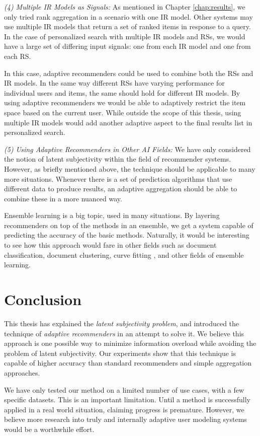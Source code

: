 \emph{(4) Multiple IR Models as Signals:}
As mentioned in Chapter \ref{chap:results},
we only tried rank aggregation in a scenario with one IR model.
Other systems may use multiple IR models
that return a set of ranked items in response to a query.
In the case of personalized search with multiple IR models
and RSs, we would have a large set of differing
input signals:
one from each IR model and one from each RS.

In this case, adaptive recommenders could be used to combine
both the RSs and IR models.
In the same way different RSs have varying performance
for individual users and items, the same should hold
for different IR models.
By using adaptive recommenders we would be able
to adaptively restrict the item space based on the 
current user.
While outside the scope of this thesis,
using multiple IR models would add another adaptive
aspect to the final results list in personalized search.


\emph{(5) Using Adaptive Recommenders in Other AI Fields:}
We have only considered the notion of latent subjectivity within the field of recommender systems.
However, as briefly mentioned above, the technique should be applicable to many more situations.
Whenever there is a set of prediction algorithms that use different data to produce results,
an adaptive aggregation should be able to combine these in a more nuanced way.

Ensemble learning is a big topic, used in many situations.
By layering recommenders on top of the methods in an ensemble, 
we get a system capable of predicting the accuracy of the basic methods.
Naturally, it would be interesting to see how this approach would fare
in other fields such as document classification, document clustering,
curve fitting \cite[p.7]{Polikar2006}, and other fields of ensemble learning.


\section{Conclusion}

This thesis has explained the \emph{latent subjectivity problem},
and introduced the technique of \emph{adaptive recommenders}
in an attempt to solve it.
We believe this approach is one possible way to minimize information overload
while avoiding the problem of latent subjectivity.
Our experiments show that this technique is capable of higher accuracy
than standard recommenders and simple aggregation approaches.

We have only tested our method on a limited 
number of use cases, with a few specific datasets.
This is an important limitation.
Until a method is successfully applied in a real world
situation, claiming progress is premature.
However, we believe more research into 
truly and internally adaptive user modeling systems
would be a worthwhile effort.

